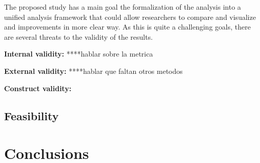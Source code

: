 \documentclass{sig-alternate}
\begin{document}
The proposed  study has a main goal the formalization
of the analysis into a unified analysis framework 
that could allow researchers to compare and
visualize and improvements in more clear way. 
As this is quite a challenging goals, there are several
threats to the validity of the results. 

\textbf{Internal validity: }  ****hablar sobre la metrica

\textbf{External validity: } ****hablar que faltan otros metodos

\textbf{ Construct validity: } 


\subsection{Feasibility}




\section{Conclusions}
\label{conclusion}

%

%
%
\end{document}
